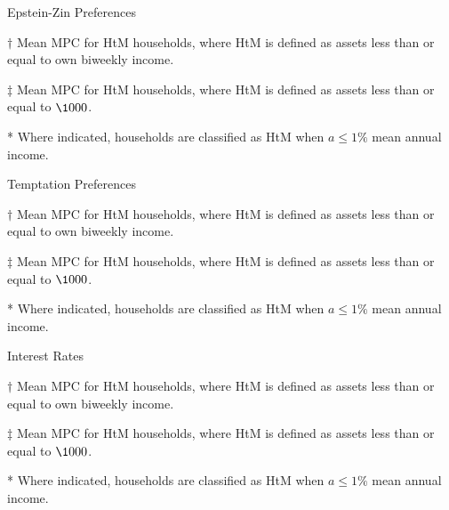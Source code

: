 \documentclass[9pt]{extarticle}
\begin{document}
\begin{table}[h]
\caption{Epstein-Zin Preferences}
\begin{threeparttable}
\centering


\begin{tablenotes}
	\item[$\dagger$] Mean MPC for HtM households, where HtM is defined as assets less than or equal to own biweekly income.
	\item[$\ddagger$] Mean MPC for HtM households, where HtM is defined as assets less than or equal to $\1000$.
	\item[*] Where indicated, households are classified as HtM when $a \leq 1\%$ mean annual income.
\end{tablenotes}
\end{threeparttable}
\end{table}

\begin{table}[h]
\caption{Temptation Preferences}
\begin{threeparttable}
\centering


\begin{tablenotes}
	\item[$\dagger$] Mean MPC for HtM households, where HtM is defined as assets less than or equal to own biweekly income.
	\item[$\ddagger$] Mean MPC for HtM households, where HtM is defined as assets less than or equal to $\1000$.
	\item[*] Where indicated, households are classified as HtM when $a \leq 1\%$ mean annual income.
\end{tablenotes}
\end{threeparttable}
\end{table}

\begin{table}[h]
\caption{Interest Rates}
\begin{threeparttable}
\centering


\begin{tablenotes}
	\item[$\dagger$] Mean MPC for HtM households, where HtM is defined as assets less than or equal to own biweekly income.
	\item[$\ddagger$] Mean MPC for HtM households, where HtM is defined as assets less than or equal to $\1000$.
	\item[*] Where indicated, households are classified as HtM when $a \leq 1\%$ mean annual income.
\end{tablenotes}
\end{threeparttable}
\end{table}
\end{document}
